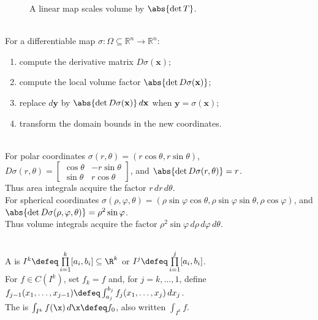 \begin{figure}[H]
  \centering
  
  \caption{A linear map scales volume by $\abs{\det T}$.}
  \label{fig:determinant-volume-scaling}
\end{figure}

\begin{method} \label{meth:change-of-variables-jacobian} \\
For a differentiable map $\sigma:\Omega\subseteq\mathbb{R}^n\to\mathbb{R}^n$:
\begin{enumerate}[label=(\roman*)]
\setlength{\itemsep}{0pt}
\item compute the derivative matrix $D\sigma(\mathbf{x})$;
\item compute the local volume factor $\abs{\det D\sigma(\mathbf{x})}$;
\item replace $d\mathbf{y}$ by $\abs{\det D\sigma(\mathbf{x})}\,d\mathbf{x}$ when $\mathbf{y}=\sigma(\mathbf{x})$;
\item transform the domain bounds in the new coordinates.
\end{enumerate}
\end{method}

\begin{example} \label{ex:polar-and-spherical-jacobians} \\
For polar coordinates $\sigma(r,\theta)=(r\cos\theta,r\sin\theta)$, $D\sigma(r,\theta)=
\begin{bmatrix}
\cos\theta & -r\sin\theta\\
\sin\theta & r\cos\theta
\end{bmatrix}$, and $\abs{\det D\sigma(r,\theta)}=r$.\\
Thus area integrals acquire the factor $r\,dr\,d\theta$.\\
For spherical coordinates $\sigma(\rho,\varphi,\theta) =(\rho\sin\varphi\cos\theta,\rho\sin\varphi\sin\theta,\rho\cos\varphi)$, and $\abs{\det D\sigma(\rho,\varphi,\theta)}=\rho^2\sin\varphi$.\\
Thus volume integrals acquire the factor $\rho^2\sin\varphi\,d\rho\,d\varphi\,d\theta$.
\end{example}

\begin{definition} \label{def:multiple-integration-core-source-todo}\label{def:k-cell-and-multiple-integral} \\
A  is $I^k\defeq\prod\limits_{i=1}^k[a_i,b_i]\subseteq\R^k$ or $I^j\defeq\prod\limits_{i=1}^j[a_i,b_i]$.\\
For $f\in C(I^k)$, set $f_k=f$ and, for $j=k,\ldots,1$, define $f_{j-1}(x_1,\ldots,x_{j-1})\defeq\int_{a_j}^{b_j}f_j(x_1,\ldots,x_j)\,dx_j$.\\
The  is $\int_{I^k}f(\x)\,d\x\defeq f_0$, also written $\int_{I^k}f$.
\end{definition}

